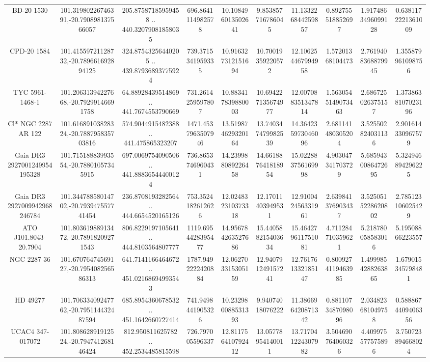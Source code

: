 \begin{table}
\begin{tabular}{cccccccccc}
BD-20  1530 & 101.31980226746391,-20.790898137566057 & 205.87587185959458 .. 440.32079081858035 & 696.8641114982578 & 10.108496013502641 & 9.853857716786045 & 11.133226844259857 & 0.892755518852697 & 1.9174863496099128 & 0.6381172221361009 \\
CPD-20  1584 & 101.41559721128732,-20.789661692894125 & 324.87543256440205 .. 439.87936893775924 & 739.3715341959335 & 10.916327312151694 & 10.70019359220572 & 12.106254467994958 & 1.57201368104473 & 2.7619408368879945 & 1.355879961098756 \\
TYC 5961-1468-1 & 101.20631394227668,-20.79299146691758 & 64.88928439514869 .. 441.7674553790669 & 731.2614259597807 & 10.883417839880003 & 10.694227135674977 & 12.007088351347814 & 1.5630545149073463 & 2.686725026375157 & 1.3738638107023196 \\
Cl* NGC 2287     AR     122 & 101.61689103828324,-20.788795835703816 & 574.9044915482388 .. 441.475865323207 & 1471.4537963507946 & 13.519874629320164 & 13.740347479982539 & 14.364235973046096 & 2.681141480305204 & 3.525502824031136 & 2.901614330967579 \\
Gaia DR3 2927001249954195328 & 101.71518883993554,-20.78801057345915 & 697.0069754090506 .. 441.88836544400124 & 736.8653746960431 & 14.239988089226458 & 14.661887641818954 & 15.022883756169998 & 4.903047341703729 & 5.6859430086472695 & 5.324946894296225 \\
Gaia DR3 2927009942968246784 & 101.34478858014702,-20.793947557741454 & 236.8708193282564 .. 444.6654520165126 & 753.3524182612626 & 12.024832310373318 & 12.17011403949531 & 12.910042456331961 & 2.639841376903437 & 3.5250515228620802 & 2.785123106025429 \\
ATO J101.8043-20.7904 & 101.80361988913472,-20.78918209271543 & 806.8229197105641 .. 444.8103564807777 & 1119.6954428395477 & 14.956784263527686 & 15.440588215403634 & 15.464279611751081 & 4.711284710359621 & 5.218780058583016 & 5.19508866223557 \\
NGC  2287    36 & 101.67076474569127,-20.795408256586313 & 641.7141166464672 .. 451.02168694993543 & 1787.9492222420884 & 12.062703315305159 & 12.940791249157241 & 12.761761332185147 & 0.8009274119463985 & 1.4999854288263865 & 1.679015345798481 \\
HD  49277 & 101.70633409247762,-20.795114432487594 & 685.8954360678532 .. 451.1642660727414 & 741.9498441905326 & 10.232980088531393 & 9.94074018076222 & 11.386696420871342 & 0.8811073487098096 & 2.034823681049758 & 0.5888674409406356 \\
UCAC4 347-017072 & 101.80862891912524,-20.794741268146424 & 812.950811625782 .. 452.2534485815598 & 726.797005596337 & 12.811756410792412 & 13.05778954140011 & 13.717041224307982 & 3.504690764060326 & 4.409975577575896 & 3.750723894668024 \\

\end{tabular}
\end{table}
